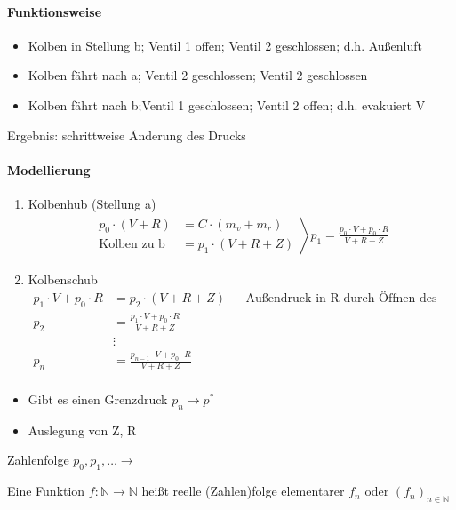 \paragraph{Funktionsweise}
\begin{itemize}
  \item Kolben in Stellung b; Ventil 1 offen; Ventil 2 geschlossen; d.h. Außenluft
  \item Kolben fährt nach a; Ventil 2 geschlossen; Ventil 2 geschlossen
  \item Kolben fährt nach b;Ventil 1 geschlossen; Ventil 2 offen; d.h. evakuiert V
\end{itemize}
Ergebnis: schrittweise Änderung des Drucks

\paragraph{Modellierung}
\begin{enumerate}
	\item Kolbenhub (Stellung a)
	\begin{align*} \left.
		\begin{aligned}
			p_0 \cdot (V + R) &= C \cdot (m_v + m_r) \\
			\text{Kolben zu b} &= p_1 \cdot (V + R + Z)
		\end{aligned} \right\rangle
		p_1 = \frac{p_0 \cdot V + p_0 \cdot R}{V + R + Z}
	\end{align*}
	\item Kolbenschub
	\begin{align*}
	p_1 \cdot V + p_0 \cdot R &= p_2 \cdot (V + R + Z) && \text{Außendruck in R durch Öffnen des Ventils 1} \\
	p_2 &= \frac{p_1 \cdot V + p_0 \cdot R}{V + R + Z} \\
	&\vdots \\
	p_n &= \frac{p_{n-1} \cdot V + p_0 \cdot R}{V + R + Z} \\
	\end{align*}
\end{enumerate}
\begin{itemize} 
  \item Gibt es einen Grenzdruck $p_n \rightarrow p^*$
  \item Auslegung von Z, R
\end{itemize}
Zahlenfolge $p_0, p_1, \ldots \rightarrow$

\begin{definition}
Eine Funktion $f: \mathbb N \rightarrow \mathbb N$ heißt reelle (Zahlen)folge elementarer $f_n$ oder $(f_n)_{n \in \mathbb N}$
\end{definition}

